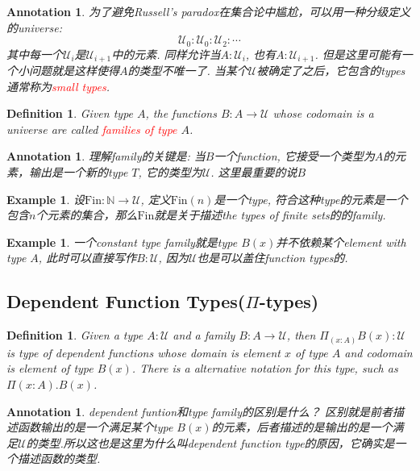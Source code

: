 \documentclass{article}
\newtheorem{example}[theorem]{Example}
\newtheorem{definition}[theorem]{Definition}
\newtheorem{annotation}[theorem]{Annotation}
\newcommand{\redt}[1]{\textcolor{red}{#1}}
\begin{document}
\begin{annotation}
\rm 为了避免Russell's paradox在集合论中尴尬，可以用一种分级定义的universe:
\[
	\mathcal{U}_0 : \mathcal{U}_0 :\mathcal{U}_2 : \cdots
\]
其中每一个$\mathcal{U}_i$是$\mathcal{U}_{i+1}$中的元素. 同样允许当$A:\mathcal{U}_i$, 也有$A : \mathcal{U}_{i+1}$. 但是这里可能有一个小问题就是这样使得$A$的类型不唯一了. 当某个$\mathcal{U}$被确定了之后，它包含的types通常称为\redt{small types}.
\end{annotation}

\begin{definition}
\rm Given type $A$, the functions $B: A \to \mathcal{U}$ whose codomain is a universe are called \redt{families of type} $A$.
\end{definition}

\begin{annotation}
\rm 理解family的关键是: 当$B$一个function, 它接受一个类型为$A$的元素，输出是一个新的type $T$, 它的类型为$\mathcal{U}$. 这里最重要的说$B$   
\end{annotation}

\begin{example}\label{ex:family_fin}
\rm 设$\text{Fin}:\mathbb{N} \to \mathcal{U}$, 定义$\text{Fin}(n)$是一个type, 符合这种type的元素是一个包含$n$个元素的集合，那么$\text{Fin}$就是关于描述the types of finite sets的的family.
\end{example}


\begin{example}
\rm 一个constant type family就是type $B(x)$并不依赖某个element with type $A$, 此时可以直接写作$B:\mathcal{U}$, 因为$\mathcal{U}$也是可以盖住function types的. 
\end{example}

\subsection{Dependent Function Types(\texorpdfstring{$\Pi$}{pi}-types)}


\begin{definition}
\rm Given a type $A:\mathcal{U}$ and a family $B:A \to \mathcal{U}$, then $\Pi_{(x:A)} B(x):\mathcal{U}$ is type of dependent functions whose domain is element $x$ of type $A$ and  codomain is element of type $B(x)$. There is a alternative notation for this type, such as $\Pi(x : A).B(x)$.
\end{definition}

\begin{annotation}
\rm dependent funtion和type family的区别是什么？ 区别就是前者描述函数输出的是一个满足某个type $B(x)$的元素，后者描述的是输出的是一个满足$\mathcal{U}$的类型.所以这也是这里为什么叫dependent function type的原因，它确实是一个描述函数的类型.
\end{annotation}
\end{document}
